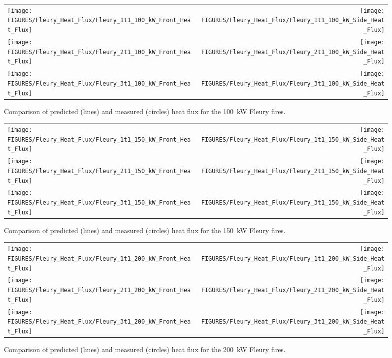 \begin{figure}[h!]
\begin{tabular*}{\textwidth}{l@{\extracolsep{\fill}}r}
\texttt{[image: FIGURES/Fleury\_Heat\_Flux/Fleury\_1t1\_100\_kW\_Front\_Heat\_Flux]} &
\texttt{[image: FIGURES/Fleury\_Heat\_Flux/Fleury\_1t1\_100\_kW\_Side\_Heat\_Flux]} \\
\texttt{[image: FIGURES/Fleury\_Heat\_Flux/Fleury\_2t1\_100\_kW\_Front\_Heat\_Flux]} &
\texttt{[image: FIGURES/Fleury\_Heat\_Flux/Fleury\_2t1\_100\_kW\_Side\_Heat\_Flux]} \\
\texttt{[image: FIGURES/Fleury\_Heat\_Flux/Fleury\_3t1\_100\_kW\_Front\_Heat\_Flux]} &
\texttt{[image: FIGURES/Fleury\_Heat\_Flux/Fleury\_3t1\_100\_kW\_Side\_Heat\_Flux]}
\end{tabular*}
\label{Fleury_Heat_Flux_100_kW}
\caption[Fleury Heat Flux, 100 kW fires.]
{Comparison of predicted (lines) and measured (circles) heat flux for the 100~kW Fleury fires.}
\end{figure}

\newpage

\begin{figure}[p]
\begin{tabular*}{\textwidth}{l@{\extracolsep{\fill}}r}
\texttt{[image: FIGURES/Fleury\_Heat\_Flux/Fleury\_1t1\_150\_kW\_Front\_Heat\_Flux]} &
\texttt{[image: FIGURES/Fleury\_Heat\_Flux/Fleury\_1t1\_150\_kW\_Side\_Heat\_Flux]} \\
\texttt{[image: FIGURES/Fleury\_Heat\_Flux/Fleury\_2t1\_150\_kW\_Front\_Heat\_Flux]} &
\texttt{[image: FIGURES/Fleury\_Heat\_Flux/Fleury\_2t1\_150\_kW\_Side\_Heat\_Flux]} \\
\texttt{[image: FIGURES/Fleury\_Heat\_Flux/Fleury\_3t1\_150\_kW\_Front\_Heat\_Flux]} &
\texttt{[image: FIGURES/Fleury\_Heat\_Flux/Fleury\_3t1\_150\_kW\_Side\_Heat\_Flux]}
\end{tabular*}
\label{Fleury_Heat_Flux_150_kW}
\caption[Fleury Heat Flux, 150 kW fires.]
{Comparison of predicted (lines) and measured (circles) heat flux for the 150~kW Fleury fires.}
\end{figure}

\begin{figure}[p]
\begin{tabular*}{\textwidth}{l@{\extracolsep{\fill}}r}
\texttt{[image: FIGURES/Fleury\_Heat\_Flux/Fleury\_1t1\_200\_kW\_Front\_Heat\_Flux]} &
\texttt{[image: FIGURES/Fleury\_Heat\_Flux/Fleury\_1t1\_200\_kW\_Side\_Heat\_Flux]} \\
\texttt{[image: FIGURES/Fleury\_Heat\_Flux/Fleury\_2t1\_200\_kW\_Front\_Heat\_Flux]} &
\texttt{[image: FIGURES/Fleury\_Heat\_Flux/Fleury\_2t1\_200\_kW\_Side\_Heat\_Flux]} \\
\texttt{[image: FIGURES/Fleury\_Heat\_Flux/Fleury\_3t1\_200\_kW\_Front\_Heat\_Flux]} &
\texttt{[image: FIGURES/Fleury\_Heat\_Flux/Fleury\_3t1\_200\_kW\_Side\_Heat\_Flux]}
\end{tabular*}
\label{Fleury_Heat_Flux_200_kW}
\caption[Fleury Heat Flux, 200 kW fires.]
{Comparison of predicted (lines) and measured (circles) heat flux for the 200~kW Fleury fires.}
\end{figure}

